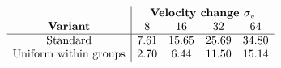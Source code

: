 \[\begin{array}{c|cccc}
      & \multicolumn{4}{c}{\textbf{Velocity change }\sigma_v} \\
      \textbf{Variant}             & 8    & 16    & 32    & 64    \\ \hline
      \text{Standard}              & 7.61 & 15.65 & 25.69 & 34.80 \\
      \text{Uniform within groups} & 2.70 & 6.44  & 11.50 & 15.14
\end{array}\]
